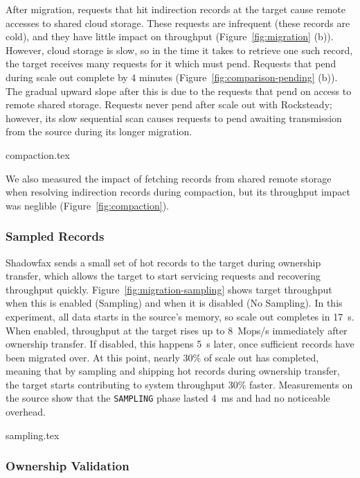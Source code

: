 After migration, requests that hit indirection records at the
target cause remote accesses to shared cloud storage.
%
These requests are infrequent (these records are
cold), and they have little impact on throughput
(Figure~\ref{fig:migration} (b)).
%
However, cloud storage is slow, so in the time it takes to retrieve one such
record, the target receives many requests for it which must pend.
%
Requests that pend during scale out complete by 4 minutes
(Figure~\ref{fig:comparison-pending} (b)).
%
The gradual upward slope after this is due to the requests that
pend on access to remote shared storage.
%
Requests never pend after scale out with Rocksteady; however, its slow
sequential scan causes requests to pend awaiting transmission from the source
during its longer migration.

 {compaction.tex}

We also measured the impact of fetching records from shared remote storage when
resolving indirection records during compaction, but its throughput impact was
neglible (Figure~\ref{fig:compaction}).

\subsubsection{Sampled Records}
\label{sec:eval:sampling}

Shadowfax sends a small set of hot records to the target during ownership
transfer, which allows the target to start servicing requests and recovering
throughput quickly.
%
Figure~\ref{fig:migration-sampling} shows target throughput
when this is enabled (Sampling) and when it is disabled (No
Sampling).
%
In this experiment, all data starts in the source's memory, so scale out
completes in 17~s.
%
When enabled, throughput at the target rises up to 8~Mops/s immediately
after ownership transfer.
%
If disabled, this happens 5~s later, once sufficient records have
been migrated over.
%
At this point, nearly 30\% of scale out has completed, meaning that
by sampling and shipping hot records during ownership transfer,
the target starts contributing to system throughput 30\% faster.
%
Measurements on the source show that the \texttt{SAMPLING} phase lasted
4~ms and had no noticeable overhead.

 {sampling.tex}

\subsubsection{Ownership Validation}
\label{sec:eval:migration:views}

